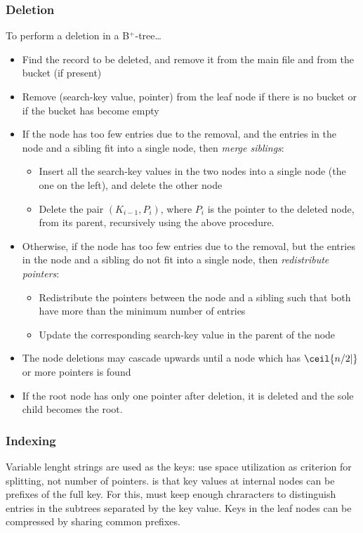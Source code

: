 \documentclass{article}
\begin{document}
\subsubsection{Deletion}

To perform a deletion in a B$^{+}$-tree\dots 
\begin{itemize}
  \item Find the record to be deleted, and remove it from the main file and from the bucket (if present)
  \item Remove (search-key value, pointer) from the leaf node if there is no bucket or if the bucket has become empty 
  \item If the node has too few entries due to the removal, and the entries in the node and a sibling fit into a single node, then \emph{merge siblings}: 
    \begin{itemize}
      \item Insert all the search-key values in the two nodes into a single node (the one on the left), and delete the other node 
      \item Delete the pair $(K_{i-1}, P_{i})$, where $P_i$ is the pointer to the deleted node, from its parent, recursively using the above procedure. 
    \end{itemize}
  \item Otherwise, if the node has too few entries due to the removal, but the entries in the node and a sibling do not fit into a single node, then \emph{redistribute pointers}: 
    \begin{itemize}
      \item Redistribute the pointers between the node and a sibling such that both have more than the minimum number of entries 
      \item Update the corresponding search-key value in the parent of the node
    \end{itemize}
  \item The node deletions may cascade upwards until a node which has $\ceil{n/2|}$ or more pointers is found 
  \item If the root node has only one pointer after deletion, it is deleted and the sole child becomes the root. 
\end{itemize}

\subsubsection{Indexing}

Variable lenght strings are used as the keys: use space utilization as criterion for splitting, not number of pointers.  is that key values at internal nodes can be prefixes of the full key. For this, must keep enough chraracters to distinguish entries in the subtrees separated by the key value. Keys in the leaf nodes can be compressed by sharing common prefixes. \\ 
\end{document}
